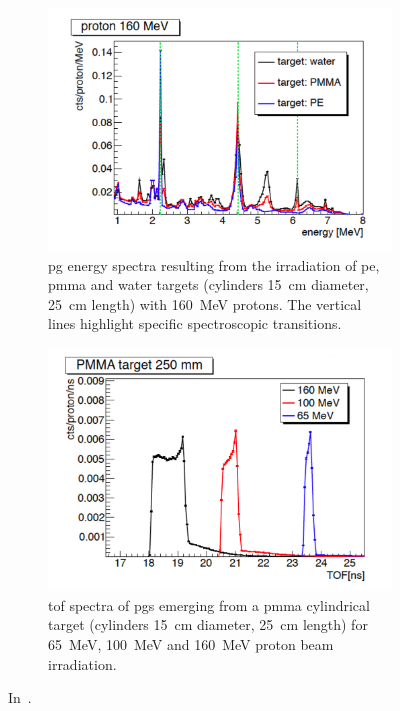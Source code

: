 \begin{figure}
\centering
\begin{subfigure}[t]{.49\textwidth}
\includegraphics[width=1.\linewidth]{03_GraphicFiles/chapter2_GammaCameras/PG_E_targets.pdf}
\caption{\gls{pg} energy spectra resulting from the irradiation of \gls{pe}, \gls{pmma} and water targets (cylinders 15~cm diameter, 25~cm length) with 160~MeV protons. The vertical lines highlight specific spectroscopic transitions.}
\label{chap2::fig::PGEdistr}
\end{subfigure}
\begin{subfigure}[t]{.49\textwidth}
\includegraphics[width=1.\linewidth]{03_GraphicFiles/chapter2_GammaCameras/PG_TOF_PMMA.pdf}
\caption{\gls{tof} spectra of \glspl{pg} emerging from a \gls{pmma} cylindrical target (cylinders 15~cm diameter, 25~cm length) for 65~MeV, 100~MeV and 160~MeV proton beam irradiation.}
\label{chap2::fig::PGTdistr}
\end{subfigure}
\caption{In~\cite{Krimmer2017}.}
\label{chap2::fig::PG_ET}
\end{figure}


